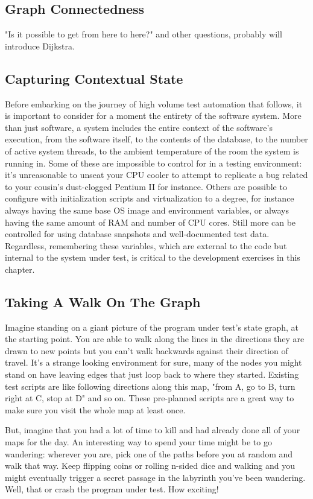 \subsection{Graph Connectedness}
"Is it possible to get from here to here?" and other questions, probably will introduce Dijkstra. %

\subsection{Capturing Contextual State}
Before embarking on the journey of high volume test automation that follows, it is important to consider for a moment the entirety of the software system. More than just software, a system includes the entire context of the software's execution, from the software itself, to the contents of the database, to the number of active system threads, to the ambient temperature of the room the system is running in. Some of these are impossible to control for in a testing environment: it's unreasonable to unseat your CPU cooler to attempt to replicate a bug related to your cousin's dust-clogged Pentium II for instance. Others are possible to configure with initialization scripts and virtualization to a degree, for instance always having the same base OS image and environment variables, or always having the same amount of RAM and number of CPU cores. Still more can be controlled for using database snapshots and well-documented test data. Regardless, remembering these variables, which are external to the code but internal to the system under test, is critical to the development exercises in this chapter.

\subsection{Taking A Walk On The Graph}
Imagine standing on a giant picture of the program under test's state graph, at the starting point. You are able to walk along the lines in the directions they are drawn to new points but you can't walk backwards against their direction of travel. It's a strange looking environment for sure, many of the nodes you might stand on have leaving edges that just loop back to where they started. Existing test scripts are like following directions along this map, "from A, go to B, turn right at C, stop at D" and so on. These pre-planned scripts are a great way to make sure you visit the whole map at least once.

But, imagine that you had a lot of time to kill and had already done all of your maps for the day. An interesting way to spend your time might be to go wandering: wherever you are, pick one of the paths before you at random and walk that way. Keep flipping coins or rolling n-sided dice and walking and you might eventually trigger a secret passage in the labyrinth you've been wandering. Well, that or crash the program under test. How exciting!

